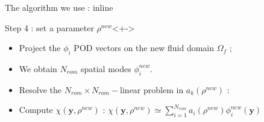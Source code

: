 \begin{frame}{The algorithm we use : inline}
%
\begin{block}{Step 4 : set a parameter $\rho^{new}$}<+->
\begin{itemize}
\item<+-> Project the $\phi_i$ POD vectors on the new fluid domain $\Omega_f$ ;
\item<+-> We obtain $N_{rom}$ spatial modes $\phi_i^{new}$.
\item<+-> Resolve the $N_{rom}\times N_{rom}-$linear problem in $a_k(\rho^{new})$ :
\end{itemize}
\begin{itemize}
\item<+-> Compute $\chi(\mathbf{y},\rho^{new})$ : $\chi\left(\mathbf{y},\rho^{new}\right)\simeq \sum\limits_{i=1}^{N_{rom}} a_i \left(\rho^{new}\right)\phi_i^{new}(\mathbf{y})$
\end{itemize}
\end{block}
%
\end{frame}
